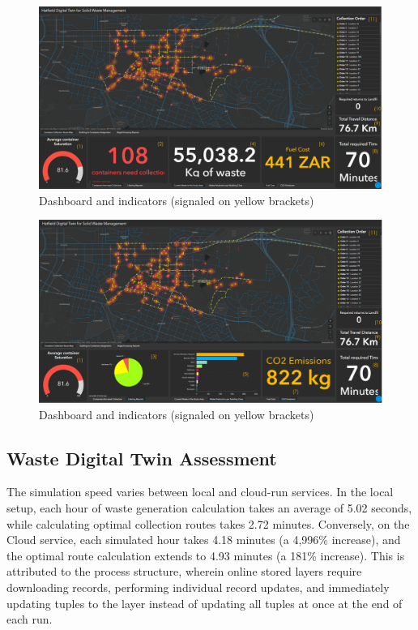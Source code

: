 \documentclass[authoryear,preprint,review,doubleblind, 12pt]{elsarticle}
\begin{document}
    \begin{figure}[h!]
    \centering
        \includegraphics[width=0.9\linewidth]{Figures/indicators1.png}
        \caption{Dashboard and indicators (signaled on yellow brackets)}
        \label{fig:indicators1}
    \end{figure}

    \begin{figure}[h!]
    \centering
        \includegraphics[width=0.9\linewidth]{Figures/indicators2.png}
        \caption{Dashboard and indicators (signaled on yellow brackets)}
        \label{fig:indicators2}
    \end{figure}

    \subsection{Waste Digital Twin Assessment} \label{subsec:Assessment}
   The simulation speed varies between local and cloud-run services. In the local setup, each hour of waste generation calculation takes an average of 5.02 seconds, while calculating optimal collection routes takes 2.72 minutes. Conversely, on the Cloud service, each simulated hour takes 4.18 minutes (a 4,996\% increase), and the optimal route calculation extends to 4.93 minutes (a 181\% increase). This is attributed to the process structure, wherein online stored layers require downloading records, performing individual record updates, and immediately updating tuples to the layer instead of updating all tuples at once at the end of each run.
\end{document}
